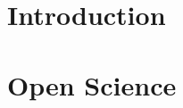 \documentclass[sigconf]{acmart} %
\begin{document}
\maketitle

\section{Introduction} %







\appendix %

\section{Open Science} %
\end{document}
